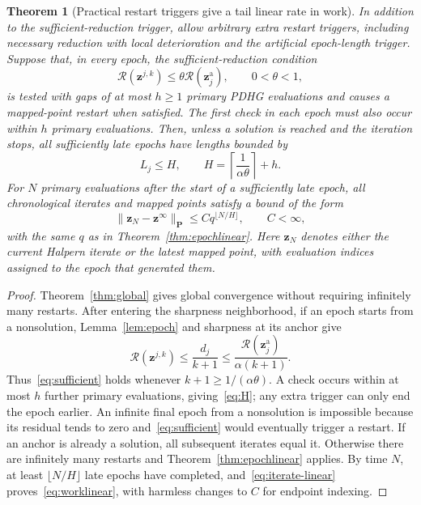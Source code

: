 \documentclass[11pt]{article}
\newtheorem{theorem}{Theorem}[section]
\theoremstyle{remark}
\newcommand{\res}{\mathcal R}
\begin{document}
\begin{theorem}[Practical restart triggers give a tail linear rate in work]
\label{thm:worklinear}
In addition to the sufficient-reduction trigger, allow arbitrary extra restart triggers, including necessary reduction with local deterioration and the artificial epoch-length trigger.
Suppose that, in every epoch, the sufficient-reduction condition
\begin{equation}
\res(\mathbf z^{j,k})\leq\theta\res(\mathbf z_j^{\mathrm a}),\qquad 0<\theta<1,
\label{eq:sufficient}
\end{equation}
is tested with gaps of at most $h\geq1$ primary PDHG evaluations and causes a mapped-point restart when satisfied.
The first check in each epoch must also occur within $h$ primary evaluations.
Then, unless a solution is reached and the iteration stops, all sufficiently late epochs have lengths bounded by
\begin{equation}
L_j\leq H,\qquad H=\left\lceil\frac{1}{\alpha\theta}\right\rceil+h.
\label{eq:H}
\end{equation}
For $N$ primary evaluations after the start of a sufficiently late epoch, all chronological iterates and mapped points satisfy a bound of the form
\begin{equation}
\|\mathbf z_N-\mathbf z^\infty\|_{\mathbf P}\leq Cq^{\lfloor N/H\rfloor},\qquad C<\infty,
\label{eq:worklinear}
\end{equation}
with the same $q$ as in Theorem~\ref{thm:epochlinear}.
Here $\mathbf z_N$ denotes either the current Halpern iterate or the latest mapped point, with evaluation indices assigned to the epoch that generated them.
\end{theorem}

\begin{proof}
Theorem~\ref{thm:global} gives global convergence without requiring infinitely many restarts.
After entering the sharpness neighborhood, if an epoch starts from a nonsolution, Lemma~\ref{lem:epoch} and sharpness at its anchor give
\begin{equation}
\res(\mathbf z^{j,k})\leq\frac{d_j}{k+1}\leq\frac{\res(\mathbf z_j^{\mathrm a})}{\alpha(k+1)}.
\end{equation}
Thus~\eqref{eq:sufficient} holds whenever $k+1\geq1/(\alpha\theta)$.
A check occurs within at most $h$ further primary evaluations, giving~\eqref{eq:H}; any extra trigger can only end the epoch earlier.
An infinite final epoch from a nonsolution is impossible because its residual tends to zero and~\eqref{eq:sufficient} would eventually trigger a restart.
If an anchor is already a solution, all subsequent iterates equal it.
Otherwise there are infinitely many restarts and Theorem~\ref{thm:epochlinear} applies.
By time $N$, at least $\lfloor N/H\rfloor$ late epochs have completed, and~\eqref{eq:iterate-linear} proves~\eqref{eq:worklinear}, with harmless changes to $C$ for endpoint indexing.
\end{proof}
\end{document}
